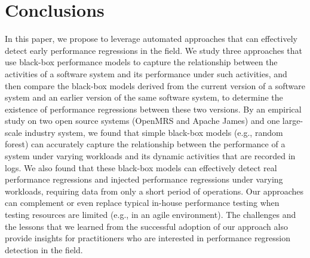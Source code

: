 \section{Conclusions} \label{sec:conclusions}


In this paper, we propose to leverage automated approaches   %
that can effectively detect early performance regressions in the field. 
We study three approaches that use black-box performance models to capture the relationship between the activities of a software system and its performance under such activities, and then compare the black-box models derived from the current version of a software system and an earlier version of the same software system, to determine the existence of performance regressions between these two versions.
By an empirical study on two open source systems (OpenMRS and Apache James) and one large-scale industry system, we found that simple black-box models (e.g., random forest) can accurately capture the relationship between the performance of a system under varying workloads and its dynamic activities that are recorded in logs.
We also found that these black-box models can effectively detect real performance regressions and injected performance regressions under varying workloads, requiring data from only a short period of operations.
Our approaches can complement or even replace typical in-house performance testing when testing resources are limited (e.g., in an agile environment).
The challenges and the lessons that we learned from the successful adoption of our approach also provide insights for practitioners who are interested in performance regression detection in the field.